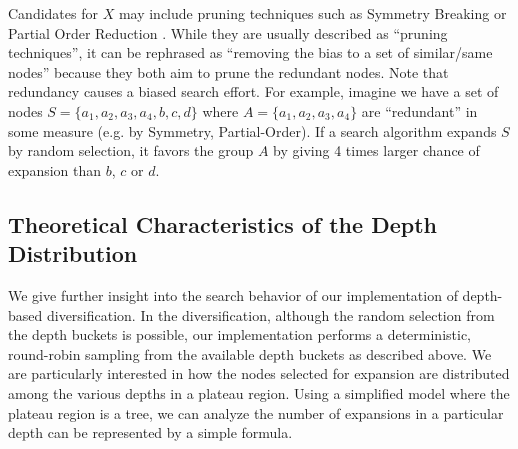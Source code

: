 Candidates for $X$ may
include pruning techniques such as Symmetry Breaking \cite{Fox1998,pochter2011exploiting,domshlak2013symmetry} or
Partial Order Reduction \cite{hall2013faster,wehrle2013relative}.
While they are usually described as ``pruning techniques'',
it can be rephrased as ``removing the bias to a set of similar/same nodes'' because
they both aim to prune the redundant nodes.
Note that redundancy causes a biased search effort. For example, imagine we have a
set of nodes $S=\{a_1, a_2, a_3, a_4, b, c, d\}$ where
$A=\{a_1, a_2, a_3, a_4\}$ are ``redundant'' in some measure (e.g. by Symmetry,
Partial-Order). 
If a search algorithm expands $S$ by random selection, it favors the
group $A$ by giving 4 times larger chance of expansion than $b$,
$c$ or $d$.

\subsection{Theoretical Characteristics of the Depth Distribution}
\label{sec:theoretical-characteristics}

We give further insight into the search behavior of our implementation of depth-based diversification.
In the diversification, although the random selection from the depth buckets is possible,
our implementation performs a deterministic, round-robin sampling from the available depth buckets as described above.
% 
We are particularly interested in how the nodes selected for expansion are distributed 
among the various depths in a plateau region.
Using a simplified model where the plateau region is a tree,
we can analyze the number of expansions in a particular depth
can be represented by a simple formula. 



